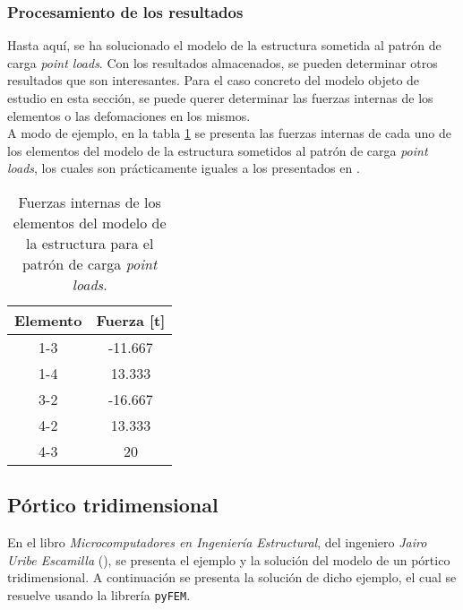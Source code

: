 \subsubsection{Procesamiento de los resultados}

Hasta aquí, se ha solucionado el modelo de la estructura sometida al patrón de carga \textit{point loads}. Con los resultados almacenados, se pueden determinar otros resultados que son interesantes. Para el caso concreto del modelo objeto de estudio en esta sección, se puede querer determinar las fuerzas internas de los elementos o las defomaciones en los mismos. \\

A modo de ejemplo, en la tabla \ref{tab:internal_forces} se presenta las fuerzas internas de cada uno de los elementos del modelo de la estructura sometidos al patrón de carga \textit{point loads}, los cuales son prácticamente iguales a los presentados en \cite{escamilla1995microcomputadores}.
\begin{table}[h]
    \centering
    \begin{tabular}{|c|c|}
        \hline
        Elemento & Fuerza [\si{\tonne}] \\
        \hline
        1-3 & -11.667 \\
        \hline
        1-4 & 13.333 \\
        \hline
        3-2 & -16.667 \\
        \hline
        4-2 & 13.333 \\
        \hline
        4-3 & 20 \\
        \hline
    \end{tabular}
    \caption{Fuerzas internas de los elementos del modelo de la estructura para el patrón de carga \textit{point loads}.}
    \label{tab:internal_forces}
\end{table}

\subsection{Pórtico tridimensional}

En el libro \textit{Microcomputadores en Ingeniería Estructural}, del ingeniero \textit{Jairo Uribe Escamilla} (\cite{escamilla1995microcomputadores}), se presenta el ejemplo y la solución del modelo de un pórtico tridimensional. A continuación se presenta la solución de dicho ejemplo, el cual se resuelve usando la librería \texttt{pyFEM}. \\

